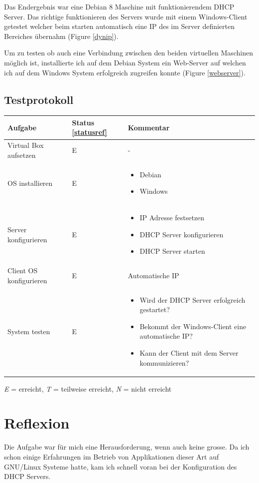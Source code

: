 \documentclass[12pt,a4paper,twoside,titlepage]{article}
\begin{document}
        Das Endergebnis war eine Debian 8 Maschine mit funktionierendem DHCP Server. Das richtige funktionieren des Servers wurde mit einem Windows-Client getestet welcher beim starten automatisch eine IP des im Server definierten Bereiches übernahm (Figure \ref{dynip}).

        Um zu testen ob auch eine Verbindung zwischen den beiden virtuellen Maschinen möglich ist, installierte ich auf dem Debian System ein Web-Server auf welchen ich auf dem Windows System erfolgreich zugreifen konnte (Figure \ref{webserver}).

        \subsection{Testprotokoll}


        \begin{tabular}{|l|l|p{7cm}|}
          \hline
          \textbf{Aufgabe} & \textbf{Status \ref{statusref}} & \textbf{Kommentar} \\\hline
          Virtual Box aufsetzen & E & - \\\hline
          OS installieren & E & \begin{itemize}
          \item Debian
          \item Windows
          \end{itemize} \\\hline
          Server konfigurieren & E & \begin{itemize}
          	\item IP Adresse festsetzen
          	\item DHCP Server konfigurieren
          	\item DHCP Server starten
          \end{itemize}\\\hline 
          Client OS konfigurieren & E & Automatische IP \\\hline
          System testen & E & \begin{itemize}
          	\item Wird der DHCP Server erfolgreich gestartet?
          	\item Bekommt der Windows-Client eine automatische IP?
          	\item Kann der Client mit dem Server kommunizieren?
          \end{itemize}\\\hline
        \end{tabular}

        \label{statusref}
        \textit{E} = erreicht, \textit{T} = teilweise erreicht, \textit{N} = nicht erreicht 
        
        \section{Reflexion}
        
        Die Aufgabe war für mich eine Herausforderung, wenn auch keine grosse. Da ich schon einige Erfahrungen im Betrieb von Applikationen dieser Art auf GNU/Linux Systeme hatte, kam ich schnell voran bei der Konfiguration des DHCP Servers.
        
        
\end{document}
